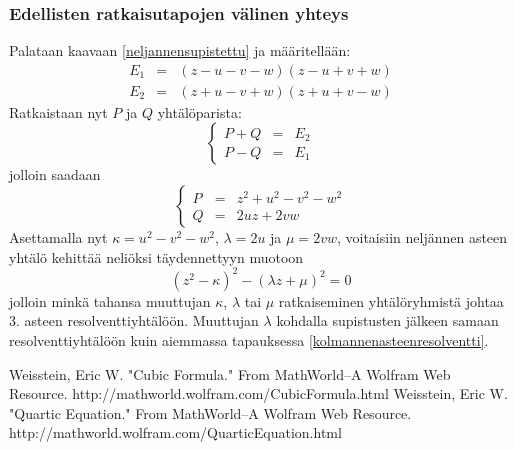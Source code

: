 \documentclass[a4paper,12pt,twoside]{article}
\begin{document}
\subsubsection{Edellisten ratkaisutapojen välinen yhteys}
Palataan kaavaan \ref{neljannensupistettu} ja määritellään:
\begin{eqnarray*}
  E_1 & = & (z-u-v-w)(z-u+v+w) \\
  E_2 & = & (z+u-v+w)(z+u+v-w)
\end{eqnarray*}
Ratkaistaan nyt $P$ ja $Q$ yhtälöparista:
$$
  \left\{
  \begin{array}{ccc}
    P+Q & = & E_2 \\
    P-Q & = & E_1
  \end{array}
  \right.
$$
jolloin saadaan
$$
  \left\{
  \begin{array}{ccc}
    P & = & z^2+u^2-v^2-w^2 \\
    Q & = & 2uz+2vw
  \end{array}
  \right.
$$
Asettamalla nyt $\kappa=u^2-v^2-w^2$, $\lambda=2u$ ja $\mu=2vw$, voitaisiin neljännen asteen yhtälö kehittää neliöksi täydennettyyn muotoon
$$
\left(z^2-\kappa\right)^2-\left(\lambda z+\mu\right)^2=0
$$
jolloin minkä tahansa muuttujan $\kappa$, $\lambda$ tai $\mu$ ratkaiseminen yhtälöryhmistä johtaa 3. asteen resolventtiyhtälöön. Muuttujan $\lambda$ kohdalla supistusten jälkeen samaan resolventtiyhtälöön kuin aiemmassa tapauksessa \ref{kolmannenasteenresolventti}.
\begin{thebibliography}{99}
 Weisstein, Eric W. "Cubic Formula." From MathWorld--A Wolfram Web Resource. http://mathworld.wolfram.com/CubicFormula.html
 Weisstein, Eric W. "Quartic Equation." From MathWorld--A Wolfram Web Resource. http://mathworld.wolfram.com/QuarticEquation.html
\end{thebibliography}
\end{document}

